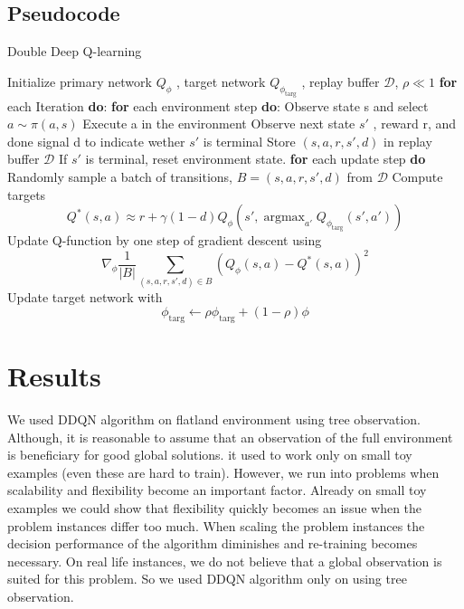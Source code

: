 \subsection{Pseudocode}

\begin{algorithm}[h]
    \caption{ Double Deep Q-learning \cite{ARTICLE:5} }
    \begin{algorithmic}
    \State Initialize primary network $Q_{\phi}$ , target network $Q_{\phi_{\text{targ}}}$ , replay buffer  $\mathcal D$,  $\rho \ll 1$
    \State \textbf{for} each Iteration \textbf{do}:
    \State \;\;\;\;\;\;\textbf{for} each environment step \textbf{do}: 
    \State \;\;\;\;\;\;\;\;\;\;\;\;Observe state s and select $a \sim \pi(a,s)$
    \State \;\;\;\;\;\;\;\;\;\;\;\;Execute a in the environment
    \State \;\;\;\;\;\;\;\;\;\;\;\;Observe next state $s'$ , reward r, and done signal d to indicate wether $s'$ is terminal
    \State \;\;\;\;\;\;\;\;\;\;\;\;Store $(s,a,r,s',d)$ in replay buffer $\mathcal D$
    \State \;\;\;\;\;\;\;\;\;\;\;\;If $s'$  is terminal, reset environment state.    
    \State \;\;\;\;\;\;\textbf{for} each update step \textbf{do}
    \State \;\;\;\;\;\;\;\;\;\;\;\;Randomly sample a batch of transitions, $B = {(s,a,r,s',d)}$ from $\mathcal D$
    \State \;\;\;\;\;\;\;\;\;\;\;\;Compute targets
    \State $$Q^*(s,a) \approx r + \gamma (1-d) Q_{\phi}(s' , \mathop{\text{argmax} }_{a'} Q_{\phi_{\text{targ}}}(s',a') )$$
    \State \;\;\;\;\;\;\;\;\;\;\;\; Update Q-function by one step of gradient descent using
    \State $$\nabla_{\phi} \frac {1}{|B|} \sum_{(s,a,r,s',d) \in B} (Q_{\phi}(s,a) - Q^*(s,a)  )^2  $$    
    \State \;\;\;\;\;\;\;\;\;\;\;\; Update target network with
    \State $$ \phi_{\text{targ}} \leftarrow \rho \phi_{\text{targ}} + (1 - \rho)\phi$$
    \end{algorithmic}
    \end{algorithm}
    
\section {Results}
We used DDQN algorithm on flatland environment using tree observation. Although,
it is reasonable to assume that an observation of the full environment is beneficiary for good global solutions. it used to work 
only on small toy examples (even these are hard to train). However, we run into problems when scalability and flexibility
 become an important factor. Already on small toy examples we could show that flexibility quickly becomes an issue
  when the problem instances differ too much. When scaling the problem instances the decision performance of the algorithm 
  diminishes and re-training becomes necessary. On real life instances, we do not believe that a global observation is suited for this 
  problem. So we used DDQN algorithm only on using tree observation.


